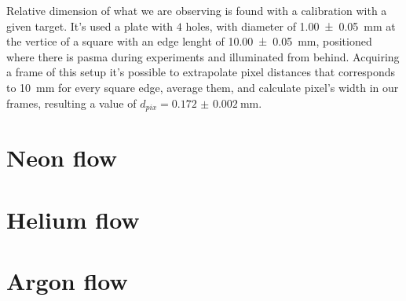Relative dimension of what we are observing is found with a calibration with a given target. It's used a plate with $4$ holes, with diameter of \SI{1.00(5)}{\milli\meter} at the vertice of a square with an edge lenght of \SI{10.00(5)}{\milli\meter}, positioned where there is pasma during experiments and illuminated from behind.
Acquiring a frame of this setup it's possible to extrapolate pixel distances that corresponds to \SI{10}{\milli\meter} for every square edge, average them, and calculate pixel's width in our frames, resulting a value of $d_{pix} = \SI{0.172(2)}{\milli\meter}$.

\section{Neon flow}


\section{Helium flow}


\section{Argon flow}









